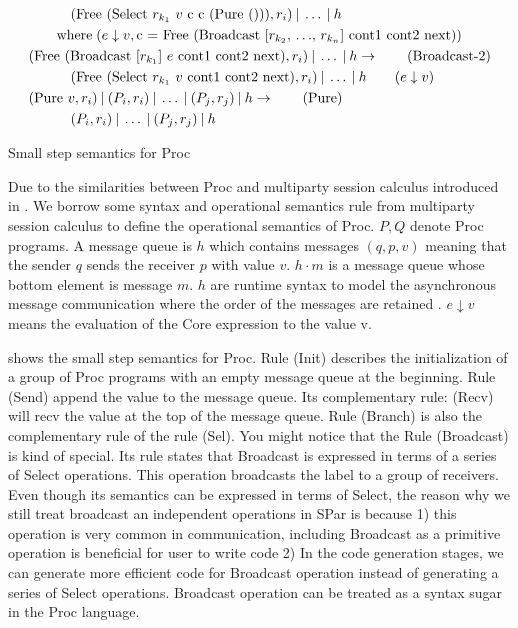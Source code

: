 \begin{table}[ht]
\begin{align*}
    &\qquad \quad (\text{Free (Select $r_{k_1}$ $v$ c c (Pure ()))}, r_i) \: | \: \ldots \: | \: h \notag\\ 
    & \qquad \text{where} \;(e \downarrow v, \text{c = Free (Broadcast [$r_{k_2}$, $\ldots$, $r_{k_n}$] cont1 cont2 next)}) \notag\\ 
    &(\text{Free (Broadcast [$r_{k_1}$] $e$ cont1 cont2 next)}, r_i) \: | \: \ldots \: | \: h \rightarrow  \tag{Broadcast-2}\\ 
    &\qquad \quad (\text{Free (Select $r_{k_1}$ $v$ cont1 cont2 next)}, r_i) \: | \: \ldots \: | \: h \qquad (e \downarrow v) \notag\\ 
    &(\text{Pure $v$}, r_i) \: | \: (P_i, r_i) \: | \: \ldots \: | \: (P_j, r_j) \: | \: h \rightarrow \tag{Pure}\\
    & \qquad \quad (P_i, r_i) \: | \: \ldots \: | \: (P_j, r_j) \: | \: h \notag\\ 
\end{align*}
\caption{Small step semantics for Proc}
\label{spar:sstep}
\end{table}
Due to the similarities between Proc and multiparty session calculus introduced in \cite{coppoGentleIntroductionMultiparty2015}. We borrow some syntax and operational semantics rule from multiparty session calculus to define the operational semantics of Proc. $P, Q$ denote Proc programs. A message queue is $h$ which contains messages $(q, p, v)$ meaning that the sender $q$ sends the receiver $p$ with value $v$. $h \cdot m$ is a message queue whose bottom element is message $m$. $h$ are runtime syntax to model the asynchronous message communication where the order of the messages are retained \cite{coppoGentleIntroductionMultiparty2015}. $e \downarrow v$ means the evaluation of the Core expression to the value v.

 shows the small step semantics for Proc. Rule (Init) describes the initialization of a group of Proc programs with an empty message queue at the beginning. Rule (Send) append the value to the message queue. Its complementary rule: (Recv) will recv the value at the top of the message queue. Rule (Branch) is also the complementary rule of the rule (Sel). You might notice that the Rule (Broadcast) is kind of special. Its rule states that Broadcast is expressed in terms of a series of Select operations. This operation broadcasts the label to a group of receivers. Even though its semantics can be expressed in terms of Select, the reason why we still treat broadcast an independent operations in SPar is because 1) this operation is very common in communication, including Broadcast as a primitive operation is beneficial for user to write code 2) In the code generation stages, we can generate more efficient code for Broadcast operation instead of generating a series of Select operations. Broadcast operation can be treated as a syntax sugar in the Proc language. %

